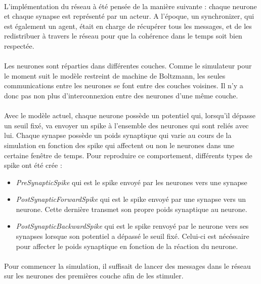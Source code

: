 \documentclass[a4paper,10pt]{article}
\begin{document}
\paragraph{}
L’implémentation du réseau à été pensée de la manière suivante : chaque neurone et chaque synapse est représenté par un acteur. A l’époque, un synchronizer, qui est également  un agent, était en charge de récupérer tous les messages, et de les redistribuer à travers le réseau pour que la cohérence dans le temps soit bien respectée. 

\paragraph{}
Les neurones sont réparties dans différentes couches. Comme le simulateur pour le moment suit le modèle restreint de machine de Boltzmann, les seules communications entre les neurones se font entre des couches voisines. Il n'y a donc pas non plus d’interconnexion entre des neurones d'une même couche.

\paragraph{}
Avec le modèle actuel, chaque neurone possède un potentiel qui, lorsqu'il dépasse un seuil fixé, va envoyer un spike à l'ensemble des neurones qui sont reliés avec lui. Chaque synapse possède un poids synaptique qui varie au cours de la simulation en fonction des spike qui affectent ou non le neurones dans une certaine fenêtre de temps. Pour reproduire ce comportement, différents types de spike ont été crée : 
\begin{itemize}
\item \emph{PreSynapticSpike} qui est le spike envoyé par les neurones vers une synapse
\item \emph{PostSynapticForwardSpike} qui est le spike envoyé par une synapse vers un neurone. Cette dernière transmet son propre poids synaptique au neurone.
\item \emph{PostSynapticBackwardSpike} qui est le spike renvoyé par le neurone vers ses synapses lorsque son potentiel a dépassé le seuil fixé. Celui-ci est nécéssaire pour affecter le poids synaptique en fonction de la réaction du neurone.
\end{itemize}

\paragraph{}
Pour commencer la simulation, il suffisait de lancer des messages dans le réseau sur les neurones des premières couche afin de les stimuler.
\end{document}

